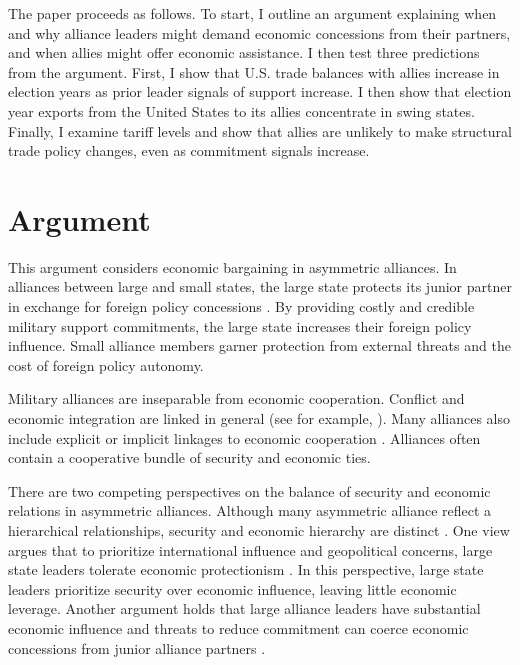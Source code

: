 \documentclass[12pt]{article}
\begin{document}
The paper proceeds as follows. 
To start, I outline an argument explaining when and why alliance leaders might demand economic concessions from their partners, and when allies might offer economic assistance. 
I then test three predictions from the argument. 
First, I show that U.S. trade balances with allies increase in election years as prior leader signals of support increase. 
I then show that election year exports from the United States to its allies concentrate in swing states. 
Finally, I examine tariff levels and show that allies are unlikely to make structural trade policy changes, even as commitment signals increase. 


\section{Argument}


This argument considers economic bargaining in asymmetric alliances. 
In alliances between large and small states, the large state protects its junior partner in exchange for foreign policy concessions \citep{Morrow1991}.
By providing costly and credible military support commitments, the large state increases their foreign policy influence. 
Small alliance members garner protection from external threats and the cost of foreign policy autonomy. 


Military alliances are inseparable from economic cooperation.
Conflict and economic integration are linked in general (see for example, \citep{GartzkeLi2003, Chen2021}).
Many alliances also include explicit or implicit linkages to economic cooperation \citep{GowaMansfield2004, LongLeeds2006, Davis2008, Poast2012}. 
Alliances often contain a cooperative bundle of security and economic ties. 


There are two competing perspectives on the balance of security and economic relations in asymmetric alliances.
Although many asymmetric alliance reflect a hierarchical relationships, security and economic hierarchy are distinct \citep{Lake2009}. 
One view argues that to prioritize international influence and geopolitical concerns, large state leaders tolerate economic protectionism \citep{Drezner2013, WolfordKim2017}. 
In this perspective, large state leaders prioritize security over economic influence, leaving little economic leverage. 
Another argument holds that large alliance leaders have substantial economic influence \citep{Norrlof2010} and threats to reduce commitment can coerce economic concessions from junior alliance partners \citep{Oatley2015}.  
\end{document}
